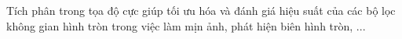\documentclass[preview]{standalone}
\begin{document}
\begin{center}
Tích phân trong tọa độ cực giúp tối ưu hóa và đánh giá hiệu suất của các bộ lọc không gian hình tròn trong việc làm mịn ảnh, phát hiện biên hình tròn, ...
\end{center}
\end{document}
